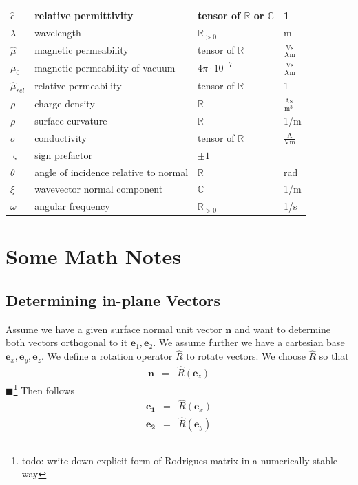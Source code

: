 \documentclass[12pt,a4paper,twoside,openright,BCOR10mm,headsepline,titlepage,abstracton,chapterprefix,final]{scrreprt}
\newcommand\Vector[1]{{\mathbf{#1}}}
\newcommand\vacuum{0}
\newcommand\Tensor[1]{\hat{#1}}
\newcommand\permeability{\Tensor{\scalarpermeability}}
\newcommand\vacuumpermeability{\scalarpermeability_{\vacuum}}
\newcommand\scalarpermeability{\mu}
\newcommand\relativepermeability{\Tensor{\mu}_{rel}}
\newcommand\scalarrelativepermittivity{\epsilon}
\newcommand\relativepermittivity{\Tensor{\scalarrelativepermittivity}}
\newcommand\conductivity{\Tensor{\sigma}}
\newcommand\chargedensity{\rho}
\newcommand{\remark}[1]{{\color{red}$\blacksquare$}\footnote{{\color{red}#1}}}
\newcommand\meter{\textrm{m}}
\newcommand\second{\textrm{s}}
\newcommand\ampere{\textrm{A}}
\newcommand\volt{\textrm{V}}
\begin{document}
\begin{tabular}{l|l|l|l}
 $\relativepermittivity$ & relative permittivity & tensor of $\mathbb{R}$ or $\mathbb{C}$ & 1\\
 \hline
 $\lambda$ & wavelength & $\mathbb{R}_{>0}$ & \meter \\
 \hline
 $\permeability$ & magnetic permeability & tensor of $\mathbb{R}$ & $\frac{\volt \second}{\ampere \meter}$ \\
 $\vacuumpermeability$ & magnetic permeability of vacuum & $4\pi \cdot 10^{-7}$ & $\frac{\volt \second}{\ampere \meter}$ \\
 $\relativepermeability$ & relative permeability & tensor of $\mathbb{R}$ & 1\\
 \hline
 $\chargedensity$ & charge density & $\mathbb{R}$ & $\frac{\ampere \second}{\meter^3}$ \\
 $\rho$ & surface curvature & $\mathbb{R}$ & 1/\meter \\
 \hline
 $\conductivity$ & conductivity & tensor of $\mathbb{R}$ & $\frac{\ampere}{\volt\meter}$\\
 \hline
 $\varsigma$ & sign prefactor & $\pm 1$ & \\
 \hline
 $\theta$ & angle of incidence relative to normal & $\mathbb{R}$ & rad \\
 \hline
 $\xi$ & wavevector normal component & $\mathbb{C}$ & 1/\meter \\
 \hline
 $\omega$ & angular frequency & $\mathbb{R}_{>0}$ & 1/\second
\end{tabular}

\chapter{Some Math Notes}
\section{Determining in-plane Vectors}
Assume we have a given surface normal unit vector $\Vector{n}$ 
and want to determine both vectors orthogonal to it $\Vector{e}_1, \Vector{e}_2$.
We assume further we have a cartesian base $\Vector{e}_x, \Vector{e}_y, \Vector{e}_z$.
We define a rotation operator $\hat{R}$ to rotate vectors.
We choose $\hat{R}$ so that
\begin{eqnarray}
 \Vector{n} &=& \hat{R}(\Vector{e}_z)
\end{eqnarray}
\remark{todo: write down explicit form of Rodrigues matrix in a numerically stable way}
Then follows
\begin{subequations}
\begin{eqnarray}
 \Vector{e_1} &=& \hat{R}(\Vector{e}_x) \\
 \Vector{e_2} &=& \hat{R}(\Vector{e}_y)
\end{eqnarray} \label{eq:normal_to_inplane_vectors}
 \end{subequations}
\end{document}
